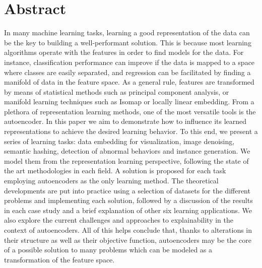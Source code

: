 




\section*{Abstract}
In many machine learning tasks, learning a good representation of the data can be the key to building a well-performant solution. This is because most learning algorithms operate with the features in order to find models for the data. For instance, classification performance can improve if the data is mapped to a space where classes are easily separated, and regression can be facilitated by finding a manifold of data in the feature space. As a general rule, features are transformed by means of statistical methods such as principal component analysis, or manifold learning techniques such as Isomap or locally linear embedding. From a plethora of representation learning methods, one of the most versatile tools is the autoencoder. In this paper we aim to demonstrate how to influence its learned representations to achieve the desired learning behavior. To this end, we present a series of learning tasks: data embedding for visualization, image denoising, semantic hashing, detection of abnormal behaviors and instance generation. We model them from the representation learning perspective, following the state of the art methodologies in each field. A solution is proposed for each task employing autoencoders as the only learning method. The theoretical developments are put into practice using a selection of datasets for the different problems and implementing each solution, followed by a discussion of the results in each case study {and a brief explanation of other six learning applications. We also explore the current challenges and approaches to explainability in the context of autoencoders.} All of this helps conclude that, thanks to alterations in their structure as well as their objective function, autoencoders may be the core of a possible solution to many problems which can be modeled as a transformation of the feature space.

